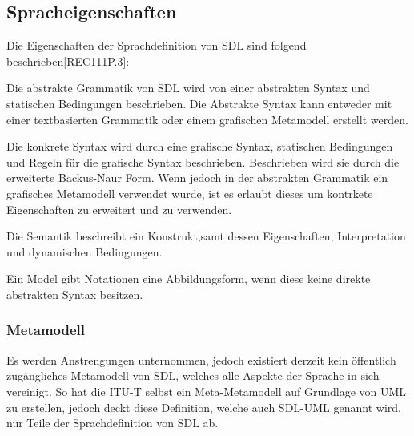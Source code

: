 \subsection{Spracheigenschaften}
\label{ssc:Spracheigenschaften}
Die Eigenschaften der Sprachdefinition von \ac{SDL} sind folgend beschrieben[REC111P.3]:
\begin{itemize}{
		\item[Abstrakte Grammatik] Die abstrakte Grammatik von \ac{SDL} wird von einer abstrakten Syntax und  statischen Bedingungen 
		beschrieben. Die Abstrakte Syntax kann entweder mit einer textbasierten Grammatik oder einem grafischen Metamodell erstellt werden.
		
		\item[Konkrete Grammatik] Die konkrete Syntax wird durch eine grafische Syntax, statischen Bedingungen und Regeln für die grafische Syntax beschrieben.
		Beschrieben wird sie durch die erweiterte Backus-Naur Form. Wenn jedoch in der abstrakten Grammatik ein 
		grafisches Metamodell verwendet wurde, ist es erlaubt dieses um kontrkete Eigenschaften zu erweitert und zu verwenden.
		
		\item[Semantik] Die Semantik beschreibt ein Konstrukt,samt dessen Eigenschaften, Interpretation und dynamischen Bedingungen.
		
		\item[Model] Ein Model gibt Notationen eine Abbildungsform, wenn diese keine direkte abstrakten Syntax besitzen.
}\end{itemize}

\subsubsection{Metamodell}
\label{ssc:Metamodell}
Es werden Anstrengungen unternommen, jedoch existiert derzeit kein öffentlich zugängliches Metamodell von \ac{SDL}, welches alle 
Aspekte der Sprache in sich vereinigt. So hat die \ac{ITU-T} selbst ein Meta-Metamodell auf Grundlage von 
\ac{UML} zu erstellen, jedoch deckt diese Definition, welche auch SDL-UML genannt wird, nur Teile der Sprachdefinition von \ac{SDL} 
ab.
